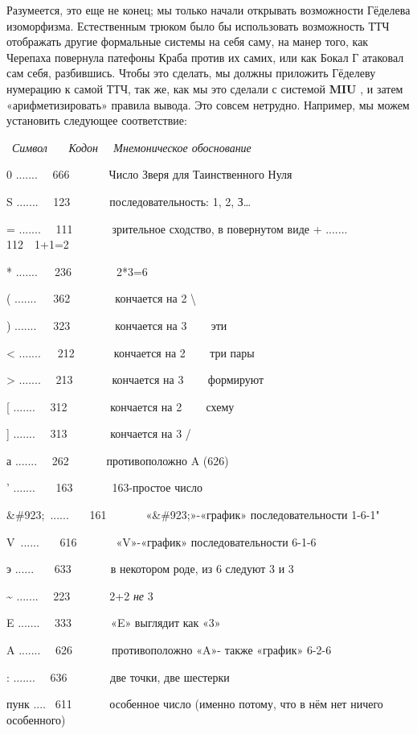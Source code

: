\documentclass[../main.tex]{subfiles}
\begin{document}
Разумеется, это еще не конец; мы только начали открывать возможности Гёделева изоморфизма. Естественным трюком было бы использовать возможность ТТЧ отображать другие формальные системы на себя саму, на манер того, как Черепаха повернула патефоны Краба против их самих, или как Бокал Г атаковал сам себя, разбившись. Чтобы это сделать, мы должны приложить Гёделеву нумерацию к самой ТТЧ, так же, как мы это сделали с системой \textbf{MIU} , и затем «арифметизировать» правила вывода. Это совсем нетрудно. Например, мы можем установить следующее соответствие:

~\emph{Символ~~~ Кодон~~ Мнемоническое обоснование}

0 .......~~ 666~~~~~~~Число Зверя для Таинственного Нуля

S .......~~ 123~~~~~~~последовательность: 1, 2, З\ldots{}

= .......~~ 111~~~~~~~зрительное сходство, в повернутом виде + ....... 112~~1+1=2

* .......~~~236~~~~~~~~2*3=6

( .......~~~362~~~~~~~~кончается на 2 \textbackslash{}

) .......~~~323~~~~~~~~кончается на 3~ \textbar~~ эти

\textless{} .......~~~212~~~~~~~кончается на 2~ \textbar~~ три пары

\textgreater{} .......~~ 213~~~~~~~кончается на 3~ \textbar~~ формируют

{[} .......~~ 312~~~~~~~ кончается на 2~ \textbar~~ схему

{]} .......~~ 313~~~~~~~ кончается на 3 /

а .......~~ 262~~~~~~ противоположно A (626)

' .......~~~ 163~~~~~~~163-простое число

\&\#923;~......~~~ 161~~~~~~~«\&\#923;»-«график» последовательности 1-6-1"

V~......~~~ 616~~~~~~~«V»-«график» последовательности 6-1-6

э ......~~~ 633~~~~~~~в некотором роде, из 6 следуют 3 и 3

\textasciitilde{} .......~~ 223~~~~~~~2+2 \emph{не} 3

E .......~~ 333~~~~~~~«E» выглядит как «3»

A .......~~ 626~~~~~~~противоположно «A»- также «график» 6-2-6

: .......~~ 636~~~~~~~ две точки, две шестерки

пунк ....~ 611~~~~~~ особенное число (именно потому, что в нём нет ничего особенного)
\end{document}
